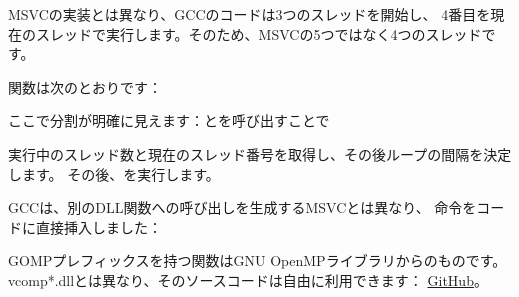 MSVCの実装とは異なり、GCCのコードは3つのスレッドを開始し、
4番目を現在のスレッドで実行します。そのため、MSVCの5つではなく4つのスレッドです。

関数は次のとおりです：
 


ここで分割が明確に見えます：とを呼び出すことで

実行中のスレッド数と現在のスレッド番号を取得し、その後ループの間隔を決定します。
その後、を実行します。

GCCは、別のDLL関数への呼び出しを生成するMSVCとは異なり、
命令をコードに直接挿入しました：



GOMPプレフィックスを持つ関数はGNU OpenMPライブラリからのものです。
vcomp*.dllとは異なり、そのソースコードは自由に利用できます：
\href{http://go.yurichev.com/17102}{GitHub}。
